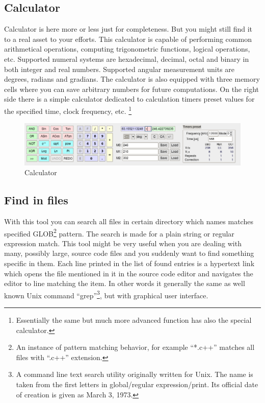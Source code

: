 \documentclass[a4paper,twoside,12pt]{book}
\begin{document}
		\subsection{Calculator}
			Calculator is here more or less just for completeness. But you might still find it to a real asset to your efforts. This calculator is capable of performing common arithmetical operations, computing trigonometric functions, logical operations, etc. Supported numeral systems are hexadecimal, decimal, octal and binary in both integer and real numbers. Supported angular measurement units are degrees, radians and gradians. The calculator is also equipped with three memory cells where you can save arbitrary numbers for future computations. On the right side there is a simple calculator dedicated to calculation timers preset values for the specified time, clock frequency, etc. \footnote{Essentially the same but much more advanced function has also the special calculator.}
			\begin{figure}[h!]
				\centering{}
				\includegraphics[width=\textwidth]{img/009.png}
				\caption{Calculator}
			\end{figure}

		\subsection{Find in files}
			With this tool you can search all files in certain directory which names matches specified GLOB\footnote{An instance of pattern matching behavior, for example ``*.c++'' matches all files with ``.c++'' extension.} pattern. The search is made for a plain string or regular expression match. This tool might be very useful when you are dealing with many, possibly large, source code files and you suddenly want to find something specific in them. Each line printed in the list of found entries is a hypertext link which opens the file mentioned in it in the source code editor and navigates the editor to line matching the item. In other words it generally the same as well known Unix command ``grep''\footnote{A command line text search utility originally written for Unix. The name is taken from the first letters in global/regular expression/print. Its official date of creation is given as March 3, 1973.}, but with graphical user interface.
\end{document}
